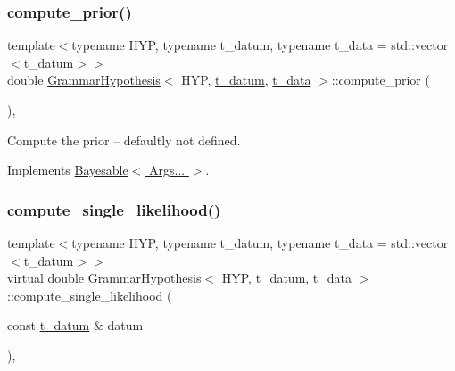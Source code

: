 \mbox{\label{class_grammar_hypothesis_a11fd75eee387330535601c9ee9d2f0f9}} 
\subsubsection{\texorpdfstring{compute\+\_\+prior()}{compute\_prior()}}
{\footnotesize\ttfamily template$<$typename H\+YP, typename t\+\_\+datum, typename t\+\_\+data = std\+::vector$<$t\+\_\+datum$>$$>$ \\
double \hyperlink{class_grammar_hypothesis}{Grammar\+Hypothesis}$<$ H\+YP, \hyperlink{class_bayesable_a7c93a2eeab708378eb321745908718d4}{t\+\_\+datum}, \hyperlink{class_bayesable_a70a593a67c7d43239ecc06bb4fd06a6b}{t\+\_\+data} $>$\+::compute\+\_\+prior (\begin{DoxyParamCaption}{ }\end{DoxyParamCaption})\hspace{0.3cm}{\ttfamily [inline]}, {\ttfamily [virtual]}}



Compute the prior -- defaultly not defined. 



Implements \hyperlink{class_bayesable_a9aa752f0adff1b95f8957b91fc928649}{Bayesable$<$ Args... $>$}.

\mbox{\label{class_grammar_hypothesis_a848ed67089c24b55cc61a4d84e350d05}} 
\subsubsection{\texorpdfstring{compute\+\_\+single\+\_\+likelihood()}{compute\_single\_likelihood()}}
{\footnotesize\ttfamily template$<$typename H\+YP, typename t\+\_\+datum, typename t\+\_\+data = std\+::vector$<$t\+\_\+datum$>$$>$ \\
virtual double \hyperlink{class_grammar_hypothesis}{Grammar\+Hypothesis}$<$ H\+YP, \hyperlink{class_bayesable_a7c93a2eeab708378eb321745908718d4}{t\+\_\+datum}, \hyperlink{class_bayesable_a70a593a67c7d43239ecc06bb4fd06a6b}{t\+\_\+data} $>$\+::compute\+\_\+single\+\_\+likelihood (\begin{DoxyParamCaption}\item[{const \hyperlink{class_bayesable_a7c93a2eeab708378eb321745908718d4}{t\+\_\+datum} \&}]{datum }\end{DoxyParamCaption})\hspace{0.3cm}{\ttfamily [inline]}, {\ttfamily [virtual]}}



